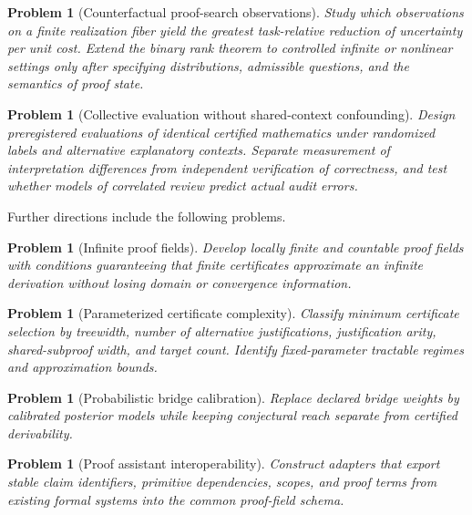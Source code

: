 \documentclass[11pt,oneside]{article}
\theoremstyle{komorebiplain}
\theoremstyle{komorebidefinition}
\newtheorem{problem}[theorem]{Problem}
\theoremstyle{komorebiremark}
\begin{document}
\begin{problem}[Counterfactual proof-search observations]
\label{res:28:2}
Study which observations on a finite realization fiber yield the greatest task-relative reduction of uncertainty per unit cost. Extend the binary rank theorem to controlled infinite or nonlinear settings only after specifying distributions, admissible questions, and the semantics of proof state.
\end{problem}

\begin{problem}[Collective evaluation without shared-context confounding]
\label{res:28:3}
Design preregistered evaluations of identical certified mathematics under randomized labels and alternative explanatory contexts. Separate measurement of interpretation differences from independent verification of correctness, and test whether models of correlated review predict actual audit errors.
\end{problem}



Further directions include the following problems.

\begin{problem}[Infinite proof fields]
\label{res:28:4}
Develop locally finite and countable proof fields with conditions guaranteeing that finite certificates approximate an infinite derivation without losing domain or convergence information.
\end{problem}

\begin{problem}[Parameterized certificate complexity]
\label{res:28:5}
Classify minimum certificate selection by treewidth, number of alternative justifications, justification arity, shared-subproof width, and target count. Identify fixed-parameter tractable regimes and approximation bounds.
\end{problem}

\begin{problem}[Probabilistic bridge calibration]
\label{res:28:6}
Replace declared bridge weights by calibrated posterior models while keeping conjectural reach separate from certified derivability.
\end{problem}

\begin{problem}[Proof assistant interoperability]
\label{res:28:7}
Construct adapters that export stable claim identifiers, primitive dependencies, scopes, and proof terms from existing formal systems into the common proof-field schema.
\end{problem}
\end{document}

